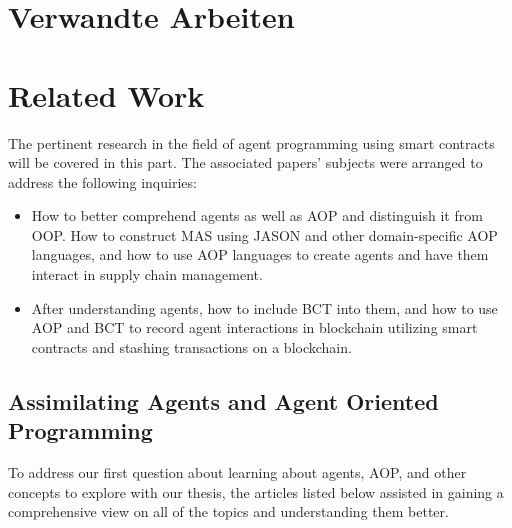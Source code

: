 {\chapter{Verwandte Arbeiten}}
{\chapter{Related Work}}
\label{sec:related}


The pertinent research in the field of agent programming using smart contracts will be covered in this part. The associated papers' subjects were arranged to address the following inquiries: 
\begin{itemize}
    \item  How to better comprehend agents as well as \ac{AOP} and distinguish it from \ac{OOP}. How to construct \ac{MAS} using JASON and other domain-specific \ac{AOP} languages, and how to use \ac{AOP} languages to create agents and have them interact in supply chain management.

    \vspace{.5cm}
    
    \item After understanding agents, how to include \ac{BCT} into them, and how to use \ac{AOP} and \ac{BCT} to record agent interactions in blockchain utilizing smart contracts and stashing transactions on a blockchain.
\end{itemize}

\section{Assimilating Agents and Agent Oriented Programming}

To address our first question about learning about agents, \ac{AOP}, and other concepts to explore with our thesis, the articles listed below assisted in gaining a comprehensive view on all of the topics and understanding them better.


